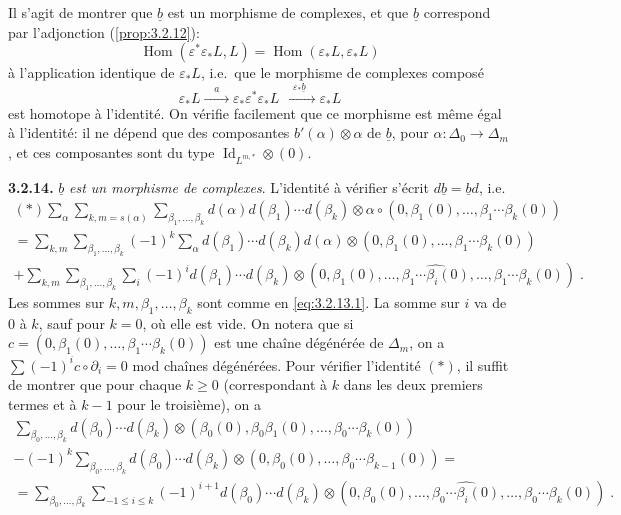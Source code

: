 \documentclass[12pt,a4paper]{article}
\theoremstyle{plain}
\theoremstyle{definition}
\DeclareMathOperator{\Hom}{Hom}
\DeclareMathOperator{\Id}{Id}
\providecommand{\Hom}{\operatorname{Hom}}
\begin{document}
Il s'agit de montrer que $\underline{b}$ est un morphisme de complexes, et que $\underline{b}$ correspond par l'adjonction (\ref{prop:3.2.12}):
\[
\Hom(\varepsilon^{*}\varepsilon_{*}L, L) = \Hom(\varepsilon_{*}L, \varepsilon_{*}L)
\]
\`{a} l'application identique de $\varepsilon_{*}L$, i.e.\ que le morphisme de complexes compos\'{e}
\[
\varepsilon_{*}L \xrightarrow{\quad a\quad} \varepsilon_{*}\varepsilon^{*}\varepsilon_{*}L \xrightarrow{\quad \varepsilon_{*}\underline{b}\quad} \varepsilon_{*}L
\]
est homotope \`{a} l'identit\'{e}. On v\'{e}rifie facilement que ce morphisme est m\^{e}me \'{e}gal \`{a} l'identit\'{e}: il ne d\'{e}pend que des composantes $b'(\alpha) \otimes \alpha$ de $\underline{b}$, pour $\alpha: \Delta_{0} \to \Delta_{m}$, et ces composantes sont du type $\Id_{L^{m,*}} \otimes (0)$.

\noindent\textbf{3.2.14.} $\underline{b}$ \emph{est un morphisme de complexes}. L'identit\'{e} \`{a} v\'{e}rifier s'\'{e}crit $d\underline{b} = \underline{b}d$, i.e.
\begin{multline*}
(*) \sum_{\alpha} \sum_{k,m=s(\alpha)} \sum_{\beta_{1},\ldots,\beta_{k}} d(\alpha)d(\beta_{1})\cdots d(\beta_{k}) \otimes \alpha \circ (0,\beta_{1}(0),\ldots,\beta_{1}\cdots\beta_{k}(0)) \\
= \sum_{k,m} \sum_{\beta_{1},\ldots,\beta_{k}} (-1)^{k} \sum_{\alpha} d(\beta_{1})\cdots d(\beta_{k})d(\alpha) \otimes (0,\beta_{1}(0),\ldots,\beta_{1}\cdots\beta_{k}(0)) \\
+ \sum_{k,m} \sum_{\beta_{1},\ldots,\beta_{k}} \sum_{i} (-1)^{i} d(\beta_{1})\cdots d(\beta_{k}) \otimes (0,\beta_{1}(0),\ldots,\widehat{\beta_{1}\cdots\beta_{i}(0)},\ldots,\beta_{1}\cdots\beta_{k}(0))\;.
\end{multline*}
Les sommes sur $k,m,\beta_{1},\ldots,\beta_{k}$ sont comme en \eqref{eq:3.2.13.1}. La somme sur $i$ va de $0$ \`{a} $k$, sauf pour $k=0$, o\`{u} elle est vide. On notera que si $c = (0,\beta_{1}(0),\ldots,\beta_{1}\cdots\beta_{k}(0))$ est une cha\^{i}ne d\'{e}g\'{e}n\'{e}r\'{e}e de $\Delta_{m}$, on a $\sum (-1)^{i} c \circ \partial_{i} = 0$ mod cha\^{i}nes d\'{e}g\'{e}n\'{e}r\'{e}es. Pour v\'{e}rifier l'identit\'{e} $(*)$, il suffit de montrer que pour chaque $k \geq 0$ (correspondant \`{a} $k$ dans les deux premiers termes et \`{a} $k-1$ pour le troisi\`{e}me), on a
\begin{multline*}
\sum_{\beta_{0},\ldots,\beta_{k}} d(\beta_{0})\cdots d(\beta_{k}) \otimes (\beta_{0}(0), \beta_{0}\beta_{1}(0), \ldots, \beta_{0}\cdots\beta_{k}(0)) \\
- (-1)^{k} \sum_{\beta_{0},\ldots,\beta_{k}} d(\beta_{0})\cdots d(\beta_{k}) \otimes (0, \beta_{0}(0), \ldots, \beta_{0}\cdots\beta_{k-1}(0)) = \\
= \sum_{\beta_{0},\ldots,\beta_{k}} \sum_{-1 \leq i \leq k} (-1)^{i+1} d(\beta_{0})\cdots d(\beta_{k}) \otimes (0, \beta_{0}(0), \ldots, \widehat{\beta_{0}\cdots\beta_{i}(0)}, \ldots, \beta_{0}\cdots\beta_{k}(0))\;.
\end{multline*}
\end{document}
